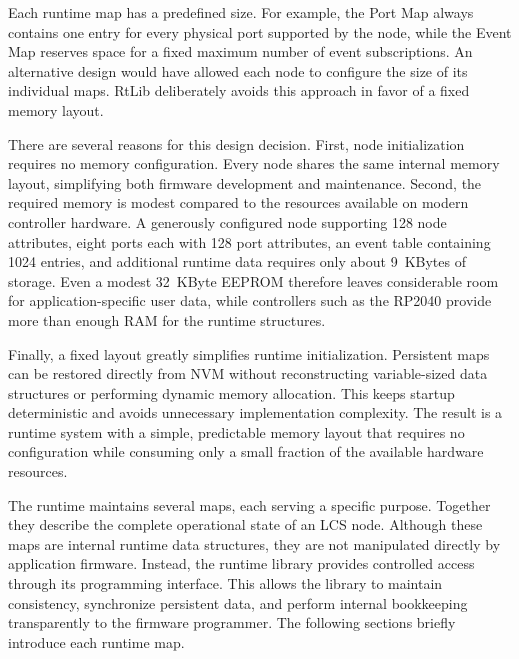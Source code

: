 
Each runtime map has a predefined size. For example, the Port Map always 
contains one entry for every physical port supported by the node, while the 
Event Map reserves space for a fixed maximum number of event subscriptions. An 
alternative design would have allowed each node to configure the size of its 
individual maps. RtLib deliberately avoids this approach in favor of a fixed 
memory layout.

There are several reasons for this design decision. First, node initialization 
requires no memory configuration. Every node shares the same internal memory 
layout, simplifying both firmware development and maintenance. Second, the 
required memory is modest compared to the resources available on modern 
controller hardware. A generously configured node supporting 128 node 
attributes, eight ports each with 128 port attributes, an event table 
containing 1024 entries, and additional runtime data requires only about 
9~KBytes of storage. Even a modest 32~KByte EEPROM therefore leaves considerable 
room for application-specific user data, while controllers such as the RP2040 
provide more than enough RAM for the runtime structures.

Finally, a fixed layout greatly simplifies runtime initialization. Persistent 
maps can be restored directly from NVM without reconstructing variable-sized 
data structures or performing dynamic memory allocation. This keeps startup 
deterministic and avoids unnecessary implementation complexity. The result is 
a runtime system with a simple, predictable memory layout that requires no 
configuration while consuming only a small fraction of the available hardware 
resources.


The runtime maintains several maps, each serving a specific purpose. Together 
they describe the complete operational state of an LCS node. Although these 
maps are internal runtime data structures, they are not manipulated directly 
by application firmware. Instead, the runtime library provides controlled 
access through its programming interface. This allows the library to maintain 
consistency, synchronize persistent data, and perform internal bookkeeping
transparently to the firmware programmer. The following sections briefly 
introduce each runtime map.

